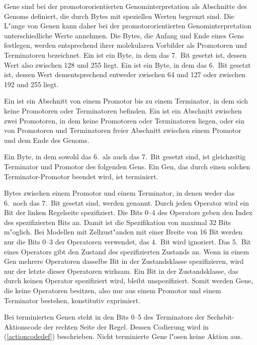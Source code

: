 Gene sind bei der promotororientierten Genominterpretation als Abschnitte des Genoms definiert,
die durch Bytes mit speziellen Werten begrenzt sind. Die L"ange von Genen kann daher bei der
promotororientierten Genominterpretation unterschiedliche Werte annehmen. Die Bytes, die Anfang
und Ende eines Gens festlegen, werden entsprechend ihrer molekularen Vorbilder als Promotoren
und Terminatoren bezeichnet. Ein  ist ein Byte, in dem das 7.\ Bit
gesetzt ist, dessen Wert also zwischen 128 und 255 liegt. Ein  ist
ein Byte, in dem das 6.\ Bit gesetzt ist, dessen Wert dementsprechend entweder
zwischen 64 und 127 oder zwischen 192 und 255 liegt.

Ein  ist ein Abschnitt von einem Promotor bis
zu einem Terminator, in dem sich keine Promotoren oder Terminatoren befinden.
Ein  ist ein Abschnitt zwischen zwei
Promotoren, in dem keine Promotoren oder Terminatoren liegen, oder ein
von Promotoren und Terminatoren freier Abschnitt zwischen einem Promotor
und dem Ende des Genoms.

Ein Byte, in dem sowohl
das 6.\ als auch das 7.\ Bit gesetzt sind, ist gleichzeitig Terminator und Promotor
des folgenden Gens. Ein Gen, das durch einen solchen Terminator-Promotor
beendet wird, ist terminiert.

Bytes zwischen einem Promotor und einem Terminator, in denen weder das
6.\ noch das 7.\ Bit gesetzt sind, werden  genannt.
Durch jeden Operator wird ein Bit der linken Regelseite spezifiziert. Die
Bits 0--4 des Operators geben den Index des spezifizierten Bits an. Damit ist
die Spezifikation von maximal 32 Bits m"oglich. Bei Modellen mit Zellzust"anden
mit einer Breite von 16 Bit werden nur die Bits 0--3 der Operatoren verwendet,
das 4.\ Bit wird ignoriert. Das 5.\ Bit eines Operators gibt den Zustand
des spezifizierten Zustands an. Wenn in einem Gen mehrere Operatoren dasselbe
Bit in der Zustandsklasse spezifizieren, wird nur der letzte dieser Operatoren
wirksam. Ein Bit in der Zustandsklasse, das durch keinen Operator spezifiziert
wird, bleibt unspezifiziert. Somit werden Gene, die keine Operatoren besitzen,
also nur aus einem Promotor und einem Terminator bestehen, konstitutiv exprimiert.

Bei terminierten Genen steht in den Bits 0--5 des Terminators der Sechsbit-Aktionscode
der rechten Seite der Regel. Dessen Codierung wird in (\ref{actioncodedef}) beschrieben.
Nicht terminierte Gene l"osen keine Aktion aus.

